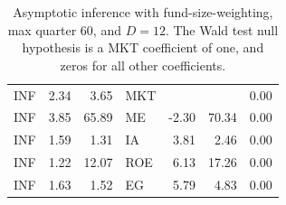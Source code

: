 \documentclass[12pt]{article}
\begin{document}
\begin{table}[ht]
\begin{tabular}{lrrlrrr}
		\hline
		INF & 2.34 & 3.65 & MKT &  &  & 0.00 \\ 
		INF & 3.85 & 65.89 & ME & -2.30 & 70.34 & 0.00 \\ 
		INF & 1.59 & 1.31 & IA & 3.81 & 2.46 & 0.00 \\ 
		INF & 1.22 & 12.07 & ROE & 6.13 & 17.26 & 0.00 \\ 
		INF & 1.63 & 1.52 & EG & 5.79 & 4.83 & 0.00 \\ 
		\hline
		\hline
	\end{tabular}
	\caption{Asymptotic inference with fund-size-weighting, max quarter 60, and $D=12$. The Wald test null hypothesis is a MKT coefficient of one, and zeros for all other coefficients.}
	\label{tab:ai_60_fw_dep}
\end{table}
\end{document}

